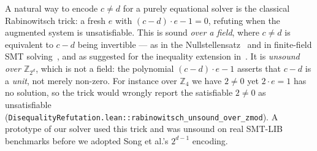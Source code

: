 \documentclass[runningheads]{llncs}
\begin{document}
\begin{remark}
A natural way to encode $c \neq d$ for a purely equational solver is
the classical Rabinowitsch trick: a fresh $e$ with
$(c-d)\cdot e - 1 = 0$, refuting when the augmented system is
unsatisfiable. This is sound \emph{over a field}, where $c \neq d$ is
equivalent to $c - d$ being invertible --- as in the
Nullstellensatz~\cite[Ch.~4]{cox2015ideals} and in finite-field SMT
solving~\cite{hader2023finitefield,Ozdemir23cvc5}, and as suggested
for the inequality extension in~\cite[\S7]{song2024equational}. It is
\emph{unsound over $\mathbb{Z}_{2^d}$}, which is not a field: the
polynomial $(c-d)\cdot e - 1$ asserts that $c-d$ is a \emph{unit}, not
merely non-zero. For instance over $\mathbb{Z}_4$ we have $2 \neq 0$
yet $2 \cdot e = 1$ has no solution, so the trick would wrongly report
the satisfiable $2 \neq 0$ as unsatisfiable
(\texttt{DisequalityRefutation.lean::rabinowitsch\_unsound\_over\_zmod}).
A prototype of our solver used this trick and was unsound on real
SMT-LIB benchmarks before we adopted Song et al.'s $2^{d-1}$ encoding.
\end{remark}
\end{document}
